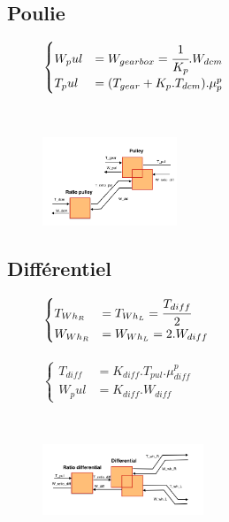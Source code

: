 \newpage
\subsection{Poulie}
\vspace{-20px}
\begin{figure}[ht]
\centering
\begin{minipage}{.5\textwidth}  
\centering
$\begin{cases}
	W_pul &= W_{gearbox} = \cfrac{1}{K_p}.W_{dcm} \\
	T_pul &= (T_{gear}+K_p.T_{dcm}).\mu{}_p^{p}
\end{cases}$
\end{minipage}~
\begin{minipage}{.5\textwidth}
  \centering
\includegraphics[height=100px]{images/Pulley.png}
\end{minipage}
\end{figure}
\FloatBarrier
\vspace{-30px}

\subsection{Différentiel}
\vspace{-0px}
\begin{figure}[ht]
\centering
\begin{minipage}{.5\textwidth}  
\centering
$\begin{cases}
	T_{Wh_R} &= T_{Wh_L} = \cfrac{T_{diff}}{2} \\
	W_{Wh_R} &= W_{Wh_L} = 2.W_{diff}
\end{cases}$\\
~\\
$\begin{cases}
	 T_{diff} &= K_{diff}.T_{pul}.\mu{}_{diff}^{p}\\
	W_pul &= K_{diff}.W_{diff}
\end{cases}$
\end{minipage}~
\begin{minipage}{.5\textwidth}
  \centering
\includegraphics[height=80px]{images/Differential.png}
\end{minipage}
\end{figure}
\FloatBarrier
\vspace{-10px}

